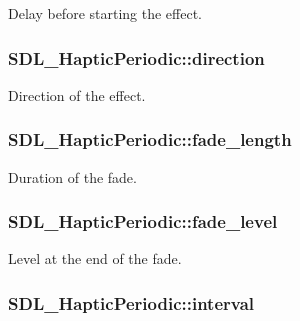 Delay before starting the effect. \hypertarget{struct_s_d_l___haptic_periodic_a2c4f27d4583187a7a994e79ad49083d3}{
\subsubsection[{direction}]{ S\-D\-L\-\_\-\-Haptic\-Periodic\-::direction}}\label{struct_s_d_l___haptic_periodic_a2c4f27d4583187a7a994e79ad49083d3}
Direction of the effect. \hypertarget{struct_s_d_l___haptic_periodic_ae1c186d02304eae142a62dca72f50fa8}{
\subsubsection[{fade\-\_\-length}]{ S\-D\-L\-\_\-\-Haptic\-Periodic\-::fade\-\_\-length}}\label{struct_s_d_l___haptic_periodic_ae1c186d02304eae142a62dca72f50fa8}
Duration of the fade. \hypertarget{struct_s_d_l___haptic_periodic_afa7713fc264959873f2a852fca4174fd}{
\subsubsection[{fade\-\_\-level}]{ S\-D\-L\-\_\-\-Haptic\-Periodic\-::fade\-\_\-level}}\label{struct_s_d_l___haptic_periodic_afa7713fc264959873f2a852fca4174fd}
Level at the end of the fade. \hypertarget{struct_s_d_l___haptic_periodic_a076d266e917098d89b2385b631629162}{
\subsubsection[{interval}]{ S\-D\-L\-\_\-\-Haptic\-Periodic\-::interval}}\label{struct_s_d_l___haptic_periodic_a076d266e917098d89b2385b631629162}
